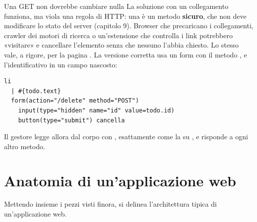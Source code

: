 \begin{warningbox}{{Una GET non dovrebbe cambiare nulla}}
  La soluzione con un collegamento funziona, ma viola una regola di HTTP: una
   è un metodo \textbf{sicuro}, che non deve modificare lo stato del
  server (capitolo 9). Browser che precaricano i collegamenti, crawler dei motori
  di ricerca o un'estensione che controlla i link potrebbero «visitare»
   e cancellare l'elemento senza che nessuno l'abbia chiesto.
  Lo stesso vale, a rigore, per la pagina . La versione corretta usa
  un form con il metodo , e l'identificativo in un campo nascosto:
\begin{lstlisting}[style=pug]
li
  | #{todo.text}
  form(action="/delete" method="POST")
    input(type="hidden" name="id" value=todo.id)
    button(type="submit") cancella
\end{lstlisting}
  Il gestore legge allora  dal corpo con ,
  esattamente come la  su , e risponde  a ogni
  altro metodo.
\end{warningbox}

\section{Anatomia di un'applicazione web}

Mettendo insieme i pezzi visti finora, si delinea l'architettura tipica di
un'applicazione web.

